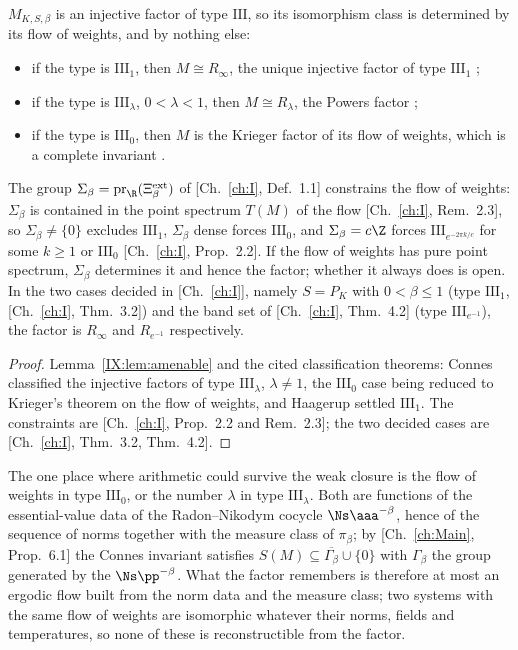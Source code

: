 \begin{theorem}\label{IX:thm:complete}
$M_{K,S,\beta}$ is an injective factor of type $\mathrm{III}$, so its isomorphism class is
determined by its flow of weights, and by nothing else:
\begin{itemize}
\item if the type is $\mathrm{III}_1$, then $M\cong R_\infty$, the unique injective factor of
type $\mathrm{III}_1$ \cite{Haagerup};
\item if the type is $\mathrm{III}_\lambda$, $0<\lambda<1$, then $M\cong R_\lambda$, the Powers
factor \cite{Connes76};
\item if the type is $\mathrm{III}_0$, then $M$ is the Krieger factor of its flow of weights,
which is a complete invariant \cite{Krieger}.
\end{itemize}
The group $\Sigma_\beta=\mathrm{pr}_\R(\Xi^{\mathrm{ext}}_\beta)$ of [Ch.~\ref{ch:I}, Def.~1.1]
constrains the flow of weights: $\Sigma_\beta$ is contained in the point spectrum $T(M)$ of
the flow [Ch.~\ref{ch:I}, Rem.~2.3], so $\Sigma_\beta\ne\{0\}$ excludes $\mathrm{III}_1$,
$\Sigma_\beta$ dense forces $\mathrm{III}_0$, and $\Sigma_\beta=c\Z$ forces
$\mathrm{III}_{e^{-2\pi k/c}}$ for some $k\ge1$ or $\mathrm{III}_0$ [Ch.~\ref{ch:I}, Prop.~2.2].
If the flow of weights has pure point spectrum, $\Sigma_\beta$ determines it and hence the
factor; whether it always does is open. In the two cases decided in [Ch.~\ref{ch:I}], namely
$S=P_K$ with $0<\beta\le1$ (type $\mathrm{III}_1$, [Ch.~\ref{ch:I}, Thm.~3.2]) and the band set
of [Ch.~\ref{ch:I}, Thm.~4.2] (type $\mathrm{III}_{e^{-1}}$), the factor is $R_\infty$ and
$R_{e^{-1}}$ respectively.
\end{theorem}

\begin{proof}
Lemma~\ref{IX:lem:amenable} and the cited classification theorems: Connes classified the
injective factors of type $\mathrm{III}_\lambda$, $\lambda\ne1$, the $\mathrm{III}_0$ case
being reduced to Krieger's theorem on the flow of weights, and Haagerup settled
$\mathrm{III}_1$. The constraints are [Ch.~\ref{ch:I}, Prop.~2.2 and Rem.~2.3]; the two
decided cases are [Ch.~\ref{ch:I}, Thm.~3.2, Thm.~4.2].
\end{proof}

\begin{remark}\label{IX:rem:remember}
The one place where arithmetic could survive the weak closure is the flow of weights in
type $\mathrm{III}_0$, or the number $\lambda$ in type $\mathrm{III}_\lambda$. Both are
functions of the essential-value data of the Radon--Nikodym cocycle $\Ns\aaa^{-\beta}$, hence
of the sequence of norms together with the measure class of $\pi_\beta$; by
[Ch.~\ref{ch:Main}, Prop.~6.1] the Connes invariant satisfies $S(M)\subseteq\overline{\Gamma_\beta}\cup\{0\}$
with $\Gamma_\beta$ the group generated by the $\Ns\pp^{-\beta}$. What the factor remembers
is therefore at most an ergodic flow built from the norm data and the measure class; two
systems with the same flow of weights are isomorphic whatever their norms, fields and
temperatures, so none of these is reconstructible from the factor.
\end{remark}

